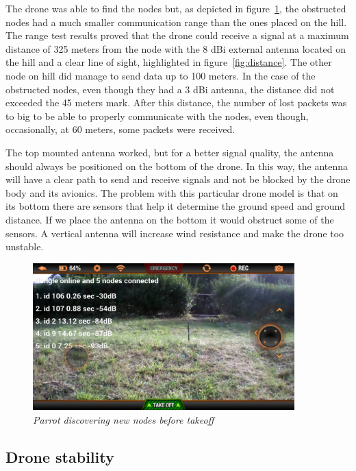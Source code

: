 The drone was able to find the nodes but, as depicted in figure~\ref{fig:discover}, the obstructed nodes had a much smaller communication range than the ones placed on the hill. The range test results proved that the drone could receive a signal at a maximum distance of 325 meters from the node with the 8 dBi external antenna located on the hill and a clear line of sight, highlighted in figure~\ref{fig:distance}. The other node on hill did manage to send data up to 100 meters. In the case of the obstructed nodes, even though they had a 3 dBi antenna, the distance did not exceeded the 45 meters mark. After this distance, the number of lost packets was to big to be able to properly communicate with the nodes, even though, occasionally, at 60 meters, some packets were received.


The top mounted antenna worked, but for a better signal quality, the antenna should always be positioned on the bottom of the drone. In this way, the antenna will have a clear path to send and receive signals and not be blocked by the drone body and its avionics. The problem with this particular drone model is that on its bottom there are sensors that help it determine the ground speed and ground distance. If we place the antenna on the bottom it would obstruct some of the sensors. A vertical antenna will increase wind resistance and make the drone too unstable.


\begin{figure}[ht]
\begin{center}
\includegraphics[width=0.9\textwidth]{img/parrot_test.png}
\end{center}
\caption{\small \itshape{Parrot discovering new nodes before takeoff}}
  \label{fig:discover}
\end{figure}

\subsection{Drone stability}

